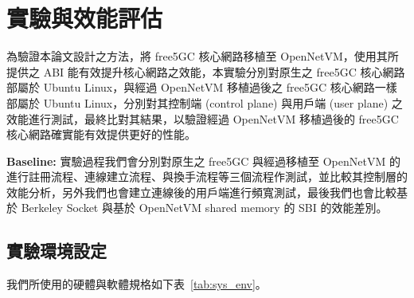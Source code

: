\chapter{實驗與效能評估}
\label{chapter:evaluation}


為驗證本論文設計之方法，將 free5GC 核心網路移植至 OpenNetVM，使用其所提供之 ABI 能有效提升核心網路之效能，本實驗分別對原生之 free5GC 核心網路部屬於 Ubuntu Linux，與經過 OpenNetVM 移植過後之 free5GC 核心網路一樣部屬於 Ubuntu Linux，分別對其控制端 (control plane) 與用戶端 (user plane) 之效能進行測試，最終比對其結果，以驗證經過 OpenNetVM 移植過後的 free5GC 核心網路確實能有效提供更好的性能。

\textbf{Baseline:} 實驗過程我們會分別對原生之 free5GC 與經過移植至 OpenNetVM 的 \LHCN 進行註冊流程、連線建立流程、與換手流程等三個流程作測試，並比較其控制層的效能分析，另外我們也會建立連線後的用戶端進行頻寬測試，最後我們也會比較基於 Berkeley Socket 與基於 OpenNetVM shared memory 的 SBI 的效能差別。

\section{實驗環境設定}
\label{sec:evaluation_env}

我們所使用的硬體與軟體規格如下表~\ref{tab:sys_env}。 

